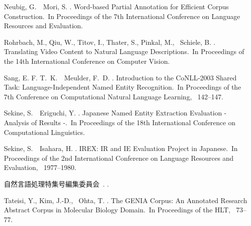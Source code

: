 \documentclass[japanese]{jnlp_1.4}
\begin{document}
\begin{thebibliography}{}
Neubig, G.\BBACOMMA\ \BBA\ Mori, S. \BBOP 2010\BBCP.
\newblock \BBOQ Word-based Partial Annotation for Efficient Corpus
  Construction.\BBCQ\
\newblock In {\Bem Proceedings of the 7th International Conference on Language
  Resources and Evaluation}.

Rohrbach, M., Qiu, W., Titov, I., Thater, S., Pinkal, M., \BBA\ Schiele, B.
  \BBOP 2013\BBCP.
\newblock \BBOQ Translating Video Content to Natural Language
  Descriptions.\BBCQ\
\newblock In {\Bem Proceedings of the 14th International Conference on Computer
  Vision}.

Sang, E. F. T.~K.\BBACOMMA\ \BBA\ Meulder, F.~D. \BBOP 2003\BBCP.
\newblock \BBOQ Introduction to the CoNLL-2003 Shared Task:
  Language-Independent Named Entity Recognition.\BBCQ\
\newblock In {\Bem Proceedings of the 7th Conference on Computational Natural
  Language Learning}, \mbox{\BPGS\ 142--147}.

Sekine, S.\BBACOMMA\ \BBA\ Eriguchi, Y. \BBOP 2000\BBCP.
\newblock \BBOQ Japanese Named Entity Extraction Evaluation - Analysis of
  Results -.\BBCQ\
\newblock In {\Bem Proceedings of the 18th International Conference on
  Computational Linguistics}.

Sekine, S.\BBACOMMA\ \BBA\ Isahara, H. \BBOP 2000\BBCP.
\newblock \BBOQ IREX: IR and IE Evaluation Project in Japanese.\BBCQ\
\newblock In {\Bem Proceedings of the 2nd International Conference on Language
  Resources and Evaluation}, \mbox{\BPGS\ 1977--1980}.

自然言語処理特集号編集委員会\JED\ \BBOP 2014\BBCP.
\newblock {}.

Tateisi, Y., Kim, J.-D., \BBA\ Ohta, T. \BBOP 2002\BBCP.
\newblock \BBOQ The GENIA Corpus: An Annotated Research Abstract Corpus in
  Molecular Biology Domain.\BBCQ\
\newblock In {\Bem Proceedings of the HLT}, \mbox{\BPGS\ 73--77}.


\end{thebibliography}
\end{document}
